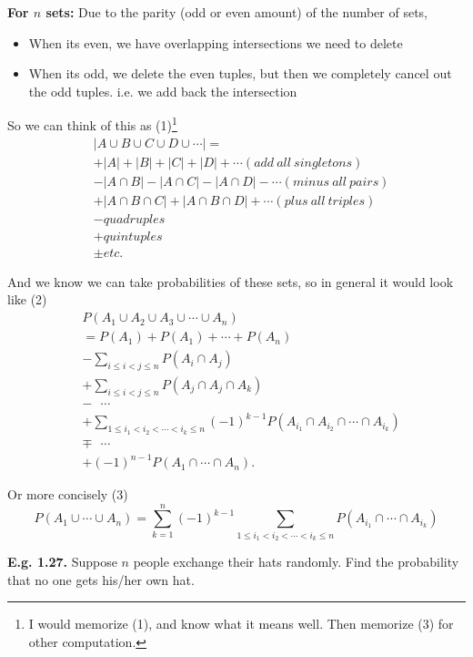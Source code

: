 \documentclass[12pt]{book}
\begin{document}
\noindent \textbf{For $n$ sets: }
Due to the parity (odd or even amount) of the number of sets, 
\begin{itemize}
\item When its even, we have overlapping intersections we need to delete
\item When its odd, we delete the even tuples, but then we completely cancel out the odd tuples. i.e. we add back the intersection
\end{itemize}
So we can think of this as (1)\footnote{I would memorize (1), and know what it means well. Then memorize (3) for other computation.}
\begin{align*}
&|A \cup B \cup C \cup D\cup \cdots| = \\
& +|A|+|B|+|C|+|D|+\cdots (add~all~singletons)\\
& -|A\cap B|-|A\cap C|-|A\cap D|-\cdots (minus~all~pairs)\\
& +|A\cap B \cap C |+|A\cap B \cap D|+\cdots (plus~all~triples)\\
& -quadruples\\
& +quintuples\\
& \pm etc.
\end{align*}

And we know we can take probabilities of these sets, so in general it would look like (2)
\begin{align*}
&P(A_{1}\cup A_{2} \cup A_{3} \cup \cdots \cup A_n)\\
&= P(A_{1}) + P(A_{1}) + \cdots +P(A_{n}) \\
& -\sum\limits_{i\leq i<j\leq n} P(A_{i}\cap A_j)\\
& + \sum\limits_{i\leq i<j\leq n} P(A_{j}\cap A_{j} \cap A_{k}) \\
&-~~~\cdots\\
&+ \sum\limits_{1\leq i_{1}<i_{2}<\cdots<i_{k}\leq n} (-1)^{k-1} P(A_{i_{1}}\cap A_{i_{2}} \cap \cdots \cap A_{i_{k}}) \\
& \mp~~~\cdots\\
& +(-1)^{n-1} P(A_{1} \cap \cdots \cap A_{n}).
\end{align*}


Or more concisely (3)\small
$$\boxed {P(A_{1} \cup \cdots \cup A_{n})=\sum\limits_{k=1}^{n} (-1)^{k-1} \sum\limits_{1\leq i_{1} <i_{2} < \cdots < i_{k} \leq n} P(A_{i_{1}} \cap \cdots \cap A_{i_{k}}) }$$
\normalsize

\noindent \textbf{E.g. 1.27. } Suppose $n$ people exchange their hats randomly. Find the probability that no one gets his/her own hat.\\
\end{document}

